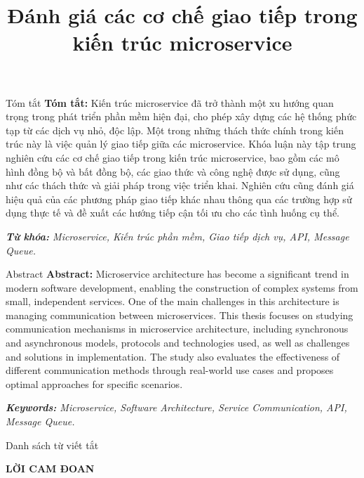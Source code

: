 \documentclass{uetgraduation}
\title{Đánh giá các cơ chế giao tiếp trong kiến trúc microservice}
\begin{document}
\makecovers

\begin{preamble}{Tóm tắt}
    \textbf{Tóm tắt:} Kiến trúc microservice đã trở thành một xu hướng quan trọng trong phát triển phần mềm hiện đại, cho phép xây dựng các hệ thống phức tạp từ các dịch vụ nhỏ, độc lập. Một trong những thách thức chính trong kiến trúc này là việc quản lý giao tiếp giữa các microservice. Khóa luận này tập trung nghiên cứu các cơ chế giao tiếp trong kiến trúc microservice, bao gồm các mô hình đồng bộ và bất đồng bộ, các giao thức và công nghệ được sử dụng, cũng như các thách thức và giải pháp trong việc triển khai. Nghiên cứu cũng đánh giá hiệu quả của các phương pháp giao tiếp khác nhau thông qua các trường hợp sử dụng thực tế và đề xuất các hướng tiếp cận tối ưu cho các tình huống cụ thể.

    \textit{\textbf{Từ khóa:} Microservice, Kiến trúc phần mềm, Giao tiếp dịch vụ, API, Message Queue.}
\end{preamble}

\begin{preamble}{Abstract}
    \textbf{Abstract:} Microservice architecture has become a significant trend in modern software development, enabling the construction of complex systems from small, independent services. One of the main challenges in this architecture is managing communication between microservices. This thesis focuses on studying communication mechanisms in microservice architecture, including synchronous and asynchronous models, protocols and technologies used, as well as challenges and solutions in implementation. The study also evaluates the effectiveness of different communication methods through real-world use cases and proposes optimal approaches for specific scenarios.

    \textit{\textbf{Keywords:} Microservice, Software Architecture, Service Communication, API, Message Queue.}
\end{preamble}

\begin{contentlisting}
    \tableofcontents
    \listoffigures
    \listoftables

    \begin{contentlistingsection}{Danh sách từ viết tắt}
    \end{contentlistingsection}
\end{contentlisting}

\newpage
\thispagestyle{empty}
\begin{center}
    \textbf{LỜI CAM ĐOAN}
\end{center}
\end{document}
